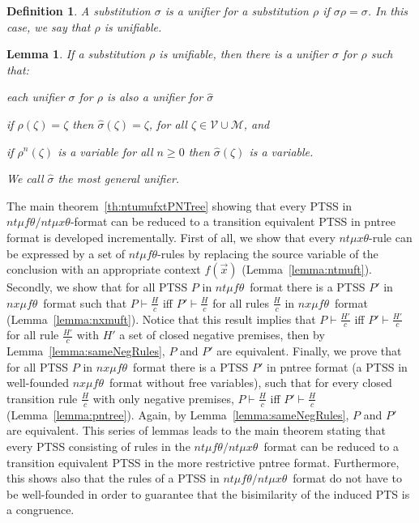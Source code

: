 \documentclass[submission,copyright,creativecommons]{eptcs}
\newtheorem{definition}{Definition}
\newtheorem{lemma}{Lemma}
\newcommand{\dedrule}[2]{\frac{#1}{#2}}
\newcommand{\TVar}{\mathcal{V}}
\newcommand{\PVar}{\mathcal{M}}
\newcommand{\ntmuft}{\ensuremath{\textit{nt}\mu\textit{f}\theta}}
\newcommand{\ntmuxt}{\ensuremath{\textit{nt}\mu\textit{x}\theta}}
\newcommand{\ntmufxt}{\ensuremath{\ntmuft\textit{/}\ntmuxt}}
\newcommand{\nxmuft}{\ensuremath{\textit{nx}\mu\textit{f}\theta}}
\newcommand{\proves}{\vdash}
\begin{document}
\begin{definition}
 A substitution $\sigma$ is a \emph{unifier} for a substitution $\rho$ if $\sigma \rho = \sigma$.
 In this case, we say that $\rho$ is \emph{unifiable}.
\end{definition}

\begin{lemma}\label{lemma:unification}
 If a substitution $\rho$ is unifiable, then there is a unifier $\hat{\sigma}$ for $\rho$  such that:
\begin{inparaenum}[(i)]
  \item each unifier $\sigma$ for $\rho$ is also a unifier for $\hat{\sigma}$
  \item if $\rho(\zeta) = \zeta$ then $\hat{\sigma}(\zeta) = \zeta$, for all $\zeta\in\TVar\cup\PVar$, and
  \item if $\rho^n(\zeta)$ is a variable for all $n \geq 0$ then $\hat{\sigma}(\zeta)$ is a variable.
 \end{inparaenum}
We call $\hat{\sigma}$ the most general unifier.
\end{lemma}

The main theorem~\ref{th:ntumufxtPNTree} showing that every PTSS in \ntmufxt-format 
can be reduced to a transition equivalent PTSS in pntree format is 
developed incrementally. 
First of all, we show that every \ntmuxt-rule can be expressed by a set of \ntmuft-rules
by replacing the source variable of the conclusion with an appropriate context 
$f(\vec{x})$ (Lemma~\ref{lemma:ntmuft}).
Secondly, we show that for all PTSS $P$ in \ntmuft\ format 
there is a PTSS $P'$ in \nxmuft\ format such that 
$P \proves \dedrule{H}{c}$ iff $P' \proves \dedrule{H}{c}$
for all rules $\dedrule{H}{c}$ in \nxmuft\ format (Lemma~\ref{lemma:nxmuft}).
Notice that this result implies that 
$P \proves \dedrule{H'}{c}$ iff $P' \proves \dedrule{H'}{c}$
for all rule $\dedrule{H'}{c}$ with $H'$ a set of closed negative premises, then
by Lemma~\ref{lemma:sameNegRules}, $P$ and $P'$ are equivalent. 
Finally, we prove that for all PTSS $P$ in \nxmuft\ format 
there is a PTSS $P'$ in  pntree format
(a PTSS in well-founded \nxmuft\ format without free variables),
such that for every closed transition rule $\dedrule{H}{c}$  
with only negative premises,
$P \proves \dedrule{H}{c}$ iff $P' \proves \dedrule{H}{c}$ (Lemma~\ref{lemma:pntree}).
Again, by Lemma~\ref{lemma:sameNegRules}, $P$ and $P'$ are
equivalent. 
This series of lemmas leads to the main theorem stating that every PTSS consisting of rules in the \ntmufxt\ format can be reduced to a transition equivalent PTSS in the more restrictive pntree format. Furthermore, this shows also that the rules of a PTSS in \ntmufxt\ format do not have to be well-founded in order to guarantee that the bisimilarity of the induced PTS is a congruence.
\end{document}
